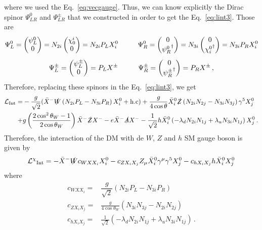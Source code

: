 where we used the Eq.~\eqref{eq:vecgauge}. Thus, we can know explicitly the Dirac spinor $\Psi_{LR}^0$ and $\Psi_{LR}^{\pm}$ that we constructed in order to get the Eq.~\eqref{eq:lint3}. Those are
\begin{align}
\Psi_L^0=\begin{pmatrix}
\psi_L^0 \\0
\end{pmatrix}
=N_{2i}\begin{pmatrix}
\chi^i_0 \\ 0
\end{pmatrix}
=N_{2i}P_LX_i^0
\hspace{1.0 cm}
\Psi_R^0=\begin{pmatrix}
0 \\ {{\psi}_R^0}^{\dagger}
\end{pmatrix}=N_{3i}\begin{pmatrix}
0 \\ {\chi_i^0}^{\dagger}
\end{pmatrix}=N_{3i}P_RX_i^0\nonumber
\end{align}
%
\begin{align}
\Psi_L^{\pm}=\begin{pmatrix}
\psi_L^{\pm} \\ 0
\end{pmatrix}=P_LX^{\pm}
\hspace{1.0 cm}
\Psi_R^{\pm}=\begin{pmatrix}
0\\ {\psi_R^{\pm}}^{\dagger}
\end{pmatrix}=P_RX^{\pm}\,,
\end{align}
%
Therefore, replacing these spinors in the Eq.~\eqref{eq:lint3}, we get
\begin{align}
\label{eq:lint4}
\mathcal{L}_{\text{Int}}= & 
-\dfrac{g}{\sqrt{2}}(\bar{X}^-\slashed{W}\left(N_{2i}P_L-N_{3i}P_R\right)X_i^0 + \text{h.c})
+ \dfrac{g}{4\cos\theta}\bar{X}_i^0\slashed{Z}\left(N_{2i}N_{2j}-N_{3i}N_{3j}\right)\gamma^5X_j^0 \nonumber\\
+& g\left(\dfrac{2\cos^2\theta_W-1}{2\cos\theta_W}\right)
\bar{X}^-\slashed{Z}X^-
-e\bar{X}^-\slashed{A}X^- 
-\dfrac{1}{\sqrt{2}}h\bar{X}_i^0\left(-\lambda_dN_{2i}N_{1j} + \lambda_uN_{3i}N_{1j}\right)X_j^0\,.
\end{align}
Therefore, the interaction of the DM with de $W$, $Z$ and $h$ SM gauge boson is given by
\begin{align}
\mathcal{L^{\chi}}_{\text{Int}}=-\bar{X}^-\slashed{W}c_{WXX_i}X_i^0
-c_{ZX_iX_j}Z_{\mu}\bar{X}_i^0\gamma^{\mu}\gamma^{5}X_j^0
-c_{hX_iX_j}h\bar{X}_i^0X_j^0
\end{align}
where 
\begin{align}
c_{WXX_i}=& \dfrac{g}{\sqrt{2}}\left(N_{2i}P_L-N_{3i}P_R\right)  \label{eq:cWXXi}\\
c_{ZX_iX_j}=&\frac{g}{4\cos\theta_W}(N_{3i}N_{3j}-N_{2i}N_{2j}) \label{eq:cZXiXj}\\
c_{hX_iX_j}=&\frac{1}{\sqrt{2}}(-\lambda_dN_{2i}N_{1j}+\lambda_uN_{3i}N_{1j})\label{eq:cHXiXj}\,.
\end{align}







